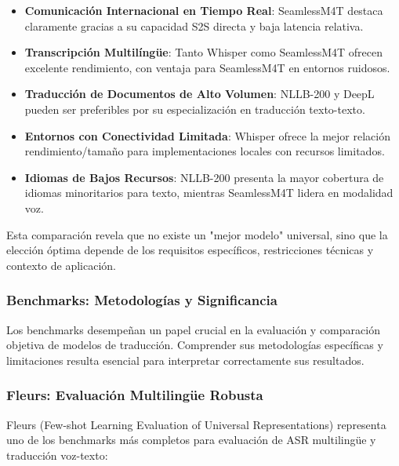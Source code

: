 \begin{itemize}
    \item \textbf{Comunicación Internacional en Tiempo Real}: SeamlessM4T destaca claramente gracias a su capacidad S2S directa y baja latencia relativa.
    \item \textbf{Transcripción Multilíngüe}: Tanto Whisper como SeamlessM4T ofrecen excelente rendimiento, con ventaja para SeamlessM4T en entornos ruidosos.
    \item \textbf{Traducción de Documentos de Alto Volumen}: NLLB-200 y DeepL pueden ser preferibles por su especialización en traducción texto-texto.
    \item \textbf{Entornos con Conectividad Limitada}: Whisper ofrece la mejor relación rendimiento/tamaño para implementaciones locales con recursos limitados.
    \item \textbf{Idiomas de Bajos Recursos}: NLLB-200 presenta la mayor cobertura de idiomas minoritarios para texto, mientras SeamlessM4T lidera en modalidad voz.
\end{itemize}

Esta comparación revela que no existe un "mejor modelo" universal, sino que la elección óptima depende de los requisitos específicos, restricciones técnicas y contexto de aplicación.

\subsubsection{Benchmarks: Metodologías y Significancia}
Los benchmarks desempeñan un papel crucial en la evaluación y comparación objetiva de modelos de traducción. Comprender sus metodologías específicas y limitaciones resulta esencial para interpretar correctamente sus resultados.

\subsubsection{Fleurs: Evaluación Multilingüe Robusta}
Fleurs (Few-shot Learning Evaluation of Universal Representations) representa uno de los benchmarks más completos para evaluación de ASR multilingüe y traducción voz-texto:

